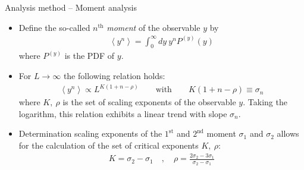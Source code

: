 \documentclass[xcolor=dvipsnames]{beamer}
\newcommand{\myitemsep}{\setlength\itemsep{0.33cm}}
\begin{document}
    \begin{frame}{Analysis method -- Moment analysis}
        \begin{itemize}
            \myitemsep
            \item {Define the so-called $n^{\mathrm{th}}$ \textit{moment} of the observable $y$ by
                \begin{align*}
                \left\langle y^n \right\rangle = \int_{0}^{\infty} dy\ y^n P^{(y)}(y)
                \end{align*}
                where $P^{(y)}$ is the PDF of $y$.
            }
            \item {For $L \to \infty$ the following relation holds:
                \begin{align*}
                \left\langle y^n \right\rangle \propto L^{K\left(1 + n - \rho \right)} \qquad \text{with}
                                                                \qquad K\left(1 + n - \rho \right) \equiv \sigma_n 
                \end{align*}
                where $K,\ \rho$ is the set of scaling exponents of the observable $y$. Taking the logarithm,
                this relation exhibits a linear trend with slope $\sigma_n$.
            }
            \item {Determination scaling exponents of the $1^{\text{st}}$ and $2^{\text{nd}}$ moment $\sigma_1$ and
                   $\sigma_2$ allows for the calculation of the set of critical exponents $K,\ \rho$:
                \begin{align*}
                K = \sigma_2 - \sigma_1 \quad , \quad \rho = \frac{2\sigma_2 - 3\sigma_1}{\sigma_2 - \sigma_1} 
                \end{align*} 
            }
        \end{itemize}
    \end{frame}
    
\end{document}

